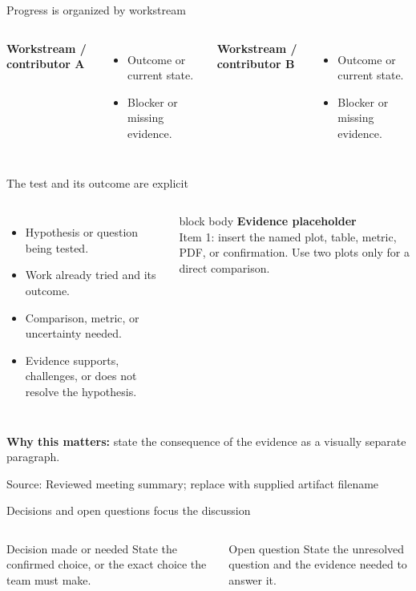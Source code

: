 \documentclass[aspectratio=169,10pt,t]{beamer}
\newcommand{\source}[1]{\par\vfill{\color{slate}\footnotesize Source: #1}\vspace{-0.18cm}}
\newcommand{\evidenceplaceholder}[1]{%
  \begin{beamercolorbox}[wd=\linewidth,sep=0.55cm,center,rounded=true]{block body}%
    {\color{slate}\textbf{Evidence placeholder}}\\[0.2em]#1
  \end{beamercolorbox}}
\begin{document}
\begin{frame}{Progress is organized by workstream}
  \begin{columns}[T,onlytextwidth]
      \textbf{Workstream / contributor A}
      \begin{itemize}
        \item Outcome or current state.
        \item Blocker or missing evidence.
      \end{itemize}
      \textbf{Workstream / contributor B}
      \begin{itemize}
        \item Outcome or current state.
        \item Blocker or missing evidence.
      \end{itemize}
  \end{columns}
\end{frame}

\begin{frame}[t]{The test and its outcome are explicit}
  \begin{columns}[T,onlytextwidth]
      \begin{itemize}
        \item Hypothesis or question being tested.
        \item Work already tried and its outcome.
        \item Comparison, metric, or uncertainty needed.
        \item Evidence supports, challenges, or does not resolve the hypothesis.
      \end{itemize}
      \evidenceplaceholder{Item 1: insert the named plot, table, metric, PDF, or confirmation. Use two plots only for a direct comparison.}
  \end{columns}
  \vspace{0.18cm}

  \textbf{Why this matters:} state the consequence of the evidence as a visually separate paragraph.
  \source{Reviewed meeting summary; replace with supplied artifact filename}
\end{frame}

\begin{frame}{Decisions and open questions focus the discussion}
  \begin{columns}[T,onlytextwidth]
      \begin{block}{Decision made or needed}
        State the confirmed choice, or the exact choice the team must make.
      \end{block}
      \begin{block}{Open question}
        State the unresolved question and the evidence needed to answer it.
      \end{block}
  \end{columns}
\end{frame}
\end{document}
